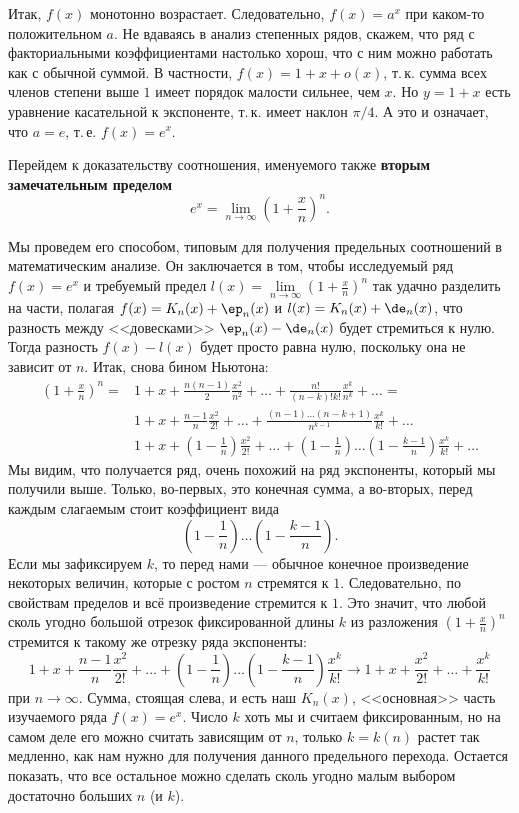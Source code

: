 \begin{enumerate}
Итак, $f(x)$ монотонно возрастает. Следовательно, $f(x)=a^x$ при каком-то положительном $a$. Не вдаваясь в анализ степенных рядов, скажем, что ряд с факториальными коэффициентами настолько хорош, что с ним можно работать как с обычной суммой. В частности, $f(x)=1+x+o(x)$, т.\,к. сумма всех членов степени выше $1$ имеет порядок малости сильнее, чем $x$. Но $y=1+x$ есть уравнение касательной к экспоненте, т.\,к. имеет наклон $\pi/4$. А это и означает, что $a=e$, т.\,е. $f(x)=e^x$.

Перейдем к доказательству соотношения, именуемого также \textbf{вторым замечательным пределом}
$$
e^x=\lim_{n\to\infty}\left(1+\frac xn\right)^n.
$$

Мы проведем его способом, типовым для получения предельных соотношений в математическим анализе. Он заключается в том, чтобы исследуемый ряд $f(x)=e^x$ и требуемый предел $l(x)=\lim\limits_{n\to\infty}\left(1+\frac xn\right)^n$ так удачно разделить на части, полагая $f(x)=K_n(x)+\ep_n(x)$ и $l(x)=K_n(x)+\de_n(x)$, что разность между <<довесками>> $\ep_n(x)-\de_n(x)$ будет стремиться к нулю. Тогда разность $f(x)-l(x)$ будет просто равна нулю, поскольку она не зависит от $n$.
Итак, снова бином Ньютона:
\begin{align*}
\left(1+\frac xn\right)^n = & 1 + x + \frac{n(n-1)}{2}\frac{x^2}{n^2} + \dots +
\frac{n!}{(n-k)!k!}\frac{x^k}{n^k}+\dots = \\
& 1 + x + \frac{n-1}{n}\frac{x^2}{2!} + \dots + \frac{(n-1)\dots(n-k+1)}{n^{k-1}}\frac{x^k}{k!}+\dots \\
& 1 + x + \left(1-\frac 1n\right)\frac{x^2}{2!} + \dots + \left(1-\frac 1n\right)\dots\left(1-\frac{k-1}{n}\right)\frac{x^k}{k!}+\dots
\end{align*}
Мы видим, что получается ряд, очень похожий на ряд экспоненты, который мы получили выше. Только, во-первых, это конечная сумма, а во-вторых, перед каждым слагаемым стоит коэффициент вида
$$
\left(1-\frac 1n\right)\dots\left(1-\frac{k-1}{n}\right).
$$
Если мы зафиксируем $k$, то перед нами --- обычное конечное произведение некоторых величин, которые с ростом $n$ стремятся к $1$. Следовательно, по свойствам пределов и всё произведение стремится к $1$. Это значит, что любой сколь угодно большой отрезок фиксированной длины $k$ из разложения $\left(1+\frac xn\right)^n$ стремится к такому же отрезку ряда экспоненты:
$$
1 + x + \frac{n-1}{n}\frac{x^2}{2!} + \dots + \left(1-\frac 1n\right)\dots\left(1-\frac{k-1}{n}\right)\frac{x^k}{k!} \to
1 + x + \frac{x^2}{2!} + \dots + \frac{x^k}{k!}
$$
при $n\to\infty$. Сумма, стоящая слева, и есть наш $K_n(x)$, <<основная>> часть изучаемого ряда $f(x)=e^x$. Число $k$ хоть мы и считаем фиксированным, но на самом деле его можно считать зависящим от $n$, только $k=k(n)$ растет так медленно, как нам нужно для получения данного предельного перехода. Остается показать, что все остальное можно сделать сколь угодно малым выбором достаточно больших $n$ (и $k$).


\end{enumerate}
